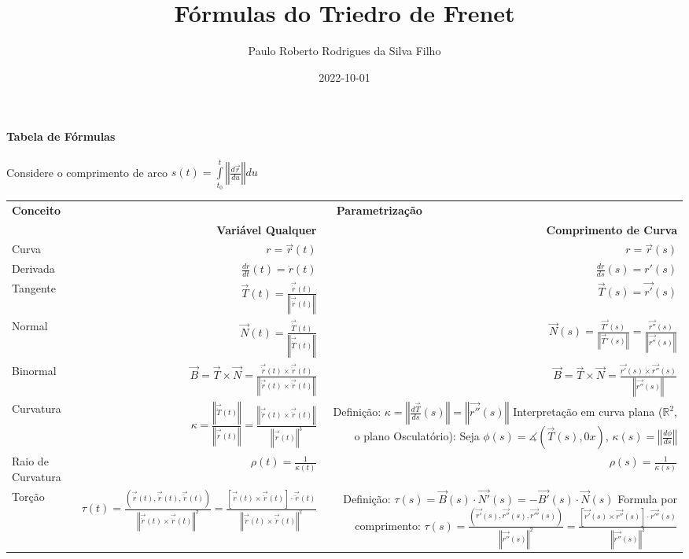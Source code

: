 \documentclass{article}
\title{Fórmulas do Triedro de Frenet}
\date{2022-10-01}
\author{Paulo Roberto Rodrigues da Silva Filho}
\newcommand\N[1]{\left\Vert#1\right\Vert}
\begin{document}
	\maketitle
	\paragraph{Tabela de Fórmulas}
	Considere o comprimento de arco $ s(t) = \int\limits_{t_0}^{t} \N{\frac{d\vec{r}}{du}}du$
	\begin{center}
		\begin{tabular}{ l | r | r  }
			\hhline{===}
			\textbf{Conceito} & 
			\multicolumn{2}{c}{\textbf{Parametrização}} \\
			{ } & \textbf{Variável Qualquer} & \textbf{Comprimento de Curva} \\
			\hhline{===}
			Curva & 
			$r = \vec{r}(t)$ & 
			$r = \vec{r}(s)$ \\  
			\hline
			Derivada & 
			$ \frac{dr}{dt}(t) = \dot r(t) $
			& $ \frac{dr}{ds}(s) = r'(s) $ \\  
			\hline
			Tangente &
			$ \vec{T}(t) = \frac{\vec{\dot r}(t)}{\N{\vec{\dot r}(t)}} $ & 
			$ \vec{T}(s) = \vec{r'}(s) $ \\  
			\hline
			Normal & $ \vec{N}(t) = \frac{\vec{\dot T}(t)}{\N{\vec{\dot T}(t)}} $ & 
			$ \vec{N}(s) = \frac{\vec{T'}(s)}{\N{\vec{T}'(s)}} = \frac{\vec{r''}(s)}{\N{ \vec{r''}(s) }}$ \\  
			\hline
			Binormal & 
			$ \vec{B} = \vec{T} \times \vec{N} = \frac{\vec{\dot r}(t) \times \vec{\ddot r}(t)}{\N{ \vec{\dot r}(t) \times \vec{\ddot r}(t) }}$ & 
			$ \vec{B} = \vec{T} \times \vec{N} = \frac{\vec{r'}(s) \times \vec{r''}(s) }{\N{ \vec{r''}(s) }}$ \\  
			\hline
			Curvatura & 
			$ \kappa = \frac{\N{ \vec{\dot T}(t) }}{ \N{ \vec{\dot r}(t) }} = \frac{\N{ \vec{\dot r}(t) \times \vec{\ddot r}(t) }}{\N{ \vec{\dot r}(t)}^3} $ & 
			\makecell[r]{Definição: \\ $ \kappa = \N{ \frac{d \vec{T}}{ds}(s) } = \N{ \vec{r''}(s) }$ \\ Interpretação em curva plana \\ 
			($\mathbb{R}^2$, o plano Osculatório): \\ Seja $ \phi(s) = \measuredangle(\vec{T}(s), 0x) $, $ \kappa(s) = \N{\frac{d\phi}{ds}} $  } \\  
			\hline
			Raio de Curvatura & $ \rho (t) = \frac{1}{\kappa (t)} $ & $ \rho (s) = \frac{1}{\kappa(s)} $ \\  
			\hline
			Torção & $ \tau(t) = \frac{(\vec{\dot{r}}(t), \vec{\ddot{r}}(t), \vec{\dddot{r}}(t))}{\N{\vec{\dot{r}}(t) \times \vec{\ddot{r}}(t)}^2} = \frac{[\vec{\dot{r}}(t) \times \vec{\ddot{r}}(t)] \cdot \vec{\dddot{r}}(t)}{\N{\vec{\dot{r}}(t) \times \vec{\ddot{r}}(t)}^2} $ & \makecell[r]{Definição: \\ $ \tau(s) = \vec{B}(s) \cdot \vec{N'}(s) = - \vec{B'}(s) \cdot \vec{N}(s) $ \\ Formula por comprimento: \\ $ \tau(s) = \frac{(\vec{r'}(s), \vec{r''}(s), \vec{r'''}(s))}{\N{\vec{r''}(s)}^2} = \frac{[\vec{r'}(s) \times \vec{r''}(s)] \cdot \vec{r'''}(s)}{\N{\vec{r''}(s)}^2} $ } \\  

\end{tabular}
\end{center}
\end{document}
